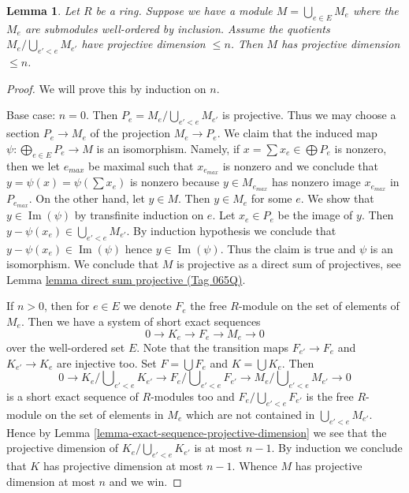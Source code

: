 \documentclass{amsart}
\theoremstyle{plain}
\newtheorem{lemma}[subsection]{Lemma}
\theoremstyle{definition}
\theoremstyle{remark}
\numberwithin{equation}{subsection}
\def\Im{\mathop{\mathrm{Im}}}
\begin{document}
\begin{lemma}
\label{lemma-colimit-projective-dimension}
Let $R$ be a ring. Suppose we have a module $M = \bigcup_{e \in E} M_e$
where the $M_e$ are submodules well-ordered by inclusion. Assume the quotients
$M_e/\bigcup\nolimits_{e' < e} M_{e'}$ have projective dimension $\leq n$.
Then $M$ has projective dimension $\leq n$.
\end{lemma}

\begin{proof}
We will prove this by induction on $n$.

\medskip\noindent
Base case: $n = 0$. Then $P_e = M_e/\bigcup_{e' < e} M_{e'}$ is projective.
Thus we may choose a section $P_e \to M_e$ of the projection $M_e \to P_e$.
We claim that the induced map $\psi : \bigoplus_{e \in E} P_e \to M$ is an
isomorphism. Namely, if $x = \sum x_e \in \bigoplus P_e$ is nonzero,
then we let $e_{max}$ be maximal such that $x_{e_{max}}$ is nonzero
and we conclude that $y = \psi(x) = \psi(\sum x_e)$ is nonzero because
$y \in M_{e_{max}}$ has nonzero image $x_{e_{max}}$ in $P_{e_{max}}$.
On the other hand, let $y \in M$. Then $y \in M_e$ for some $e$.
We show that $y \in \Im(\psi)$ by transfinite induction on $e$.
Let $x_e \in P_e$ be the image of $y$. Then
$y - \psi(x_e) \in \bigcup_{e' < e} M_{e'}$.
By induction hypothesis we conclude that $y - \psi(x_e) \in \Im(\psi)$
hence $y \in \Im(\psi)$. Thus the claim is true and
$\psi$ is an isomorphism. We conclude that $M$ is projective as
a direct sum of projectives, see
Lemma \href{https://stacks.math.columbia.edu/tag/065Q}{lemma direct sum projective (Tag 065Q)}.

\medskip\noindent
If $n > 0$, then for $e \in E$ we denote $F_e$ the free $R$-module
on the set of elements of $M_e$. Then we have a system of
short exact sequences
$$
0 \to K_e \to F_e \to M_e \to 0
$$
over the well-ordered set $E$. Note that the transition maps
$F_{e'} \to F_e$ and $K_{e'} \to K_e$ are injective too.
Set $F = \bigcup F_e$ and $K = \bigcup K_e$. Then
$$
0 \to
K_e/\bigcup\nolimits_{e' < e} K_{e'} \to
F_e/\bigcup\nolimits_{e' < e} F_{e'} \to
M_e/\bigcup\nolimits_{e' < e} M_{e'} \to 0
$$
is a short exact sequence of $R$-modules too and
$F_e/\bigcup_{e' < e} F_{e'}$ is the free $R$-module on the
set of elements in $M_e$ which are not contained in $\bigcup_{e' < e} M_{e'}$.
Hence by
Lemma \ref{lemma-exact-sequence-projective-dimension}
we see that the projective dimension of $K_e/\bigcup_{e' < e} K_{e'}$
is at most $n - 1$. By induction we conclude that $K$ has projective
dimension at most $n - 1$. Whence $M$ has projective dimension at most
$n$ and we win.
\end{proof}
\end{document}
